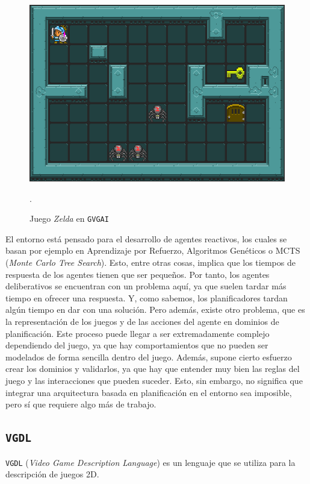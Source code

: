 \begin{figure}[H]
    \centering
    \includegraphics[scale=0.4]{img/CH02/zelda.png}
    \caption{Juego \textit{Zelda} en \texttt{GVGAI}}.
    \label{fig:zelda}
\end{figure}

El entorno está pensado para el desarrollo de agentes reactivos, los cuales se basan por ejemplo en
Aprendizaje por Refuerzo, Algoritmos Genéticos o MCTS (\textit{Monte Carlo Tree Search}). Esto, entre
otras cosas, implica que los tiempos de respuesta de los agentes tienen que ser pequeños. Por tanto,
los agentes deliberativos se encuentran con un problema aquí, ya que suelen tardar más tiempo en ofrecer
una respuesta. Y, como sabemos, los planificadores tardan algún tiempo en dar con una solución. Pero además,
existe otro problema, que es la representación de los juegos y de las acciones del agente en
dominios de planificación. Este proceso puede llegar a ser extremadamente complejo dependiendo
del juego, ya que hay comportamientos que no pueden ser modelados de forma sencilla dentro del juego.
Además, supone cierto esfuerzo crear los dominios y validarlos, ya que hay que entender muy bien las reglas
del juego y las interacciones que pueden suceder. Esto, sin embargo, no significa que integrar una arquitectura
basada en planificación en el entorno sea imposible, pero sí que requiere algo más de trabajo.

\subsection{\texttt{VGDL}}

\texttt{VGDL} (\textit{Video Game Description Language}) \cite{Schaul2013AVG} es un lenguaje que se
utiliza para la descripción de juegos 2D.

